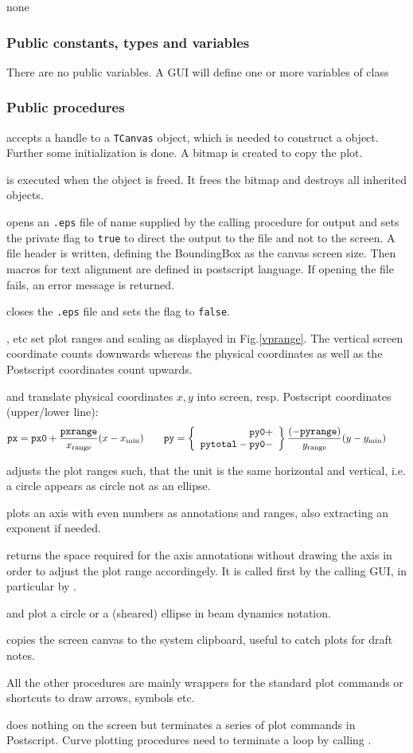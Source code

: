 \documentclass[12pt]{article}
\newcommand\code[1]{{\tt #1}}
\newcommand{\unico}[1]{{\color{burntorange}\code{#1}}}
\newcommand{\opaguif}[1]{\colorbox{violet!30}{{\color{black}\code{#1}}}}
\newcommand{\oguif}[1]{\hyperref[#1]{\opaguif{#1}}}
\newcommand{\uses}[1]{\flushleft {\bf Uses:} #1}
\newcommand{\pvar}[1]{\subsubsection*{Public constants, types and variables} #1}
\newcommand{\ppro}[1]{\subsubsection*{Public procedures} #1}
\begin{document}
\uses{none}

\pvar{
There are no public variables. A GUI will define one or more variables of class \unico{Vplot}
}

\ppro{
\unico{Create} accepts a handle to a \code{TCanvas} object, which is needed to construct a \unico{Vplot} object. Further some initialization is done. A bitmap is created to copy the plot.

\unico{Destroy} is executed when the \unico{Vplot} object is freed. It frees the bitmap and destroys all inherited objects. 

\unico{PS\_start} opens an \code{*.eps} file of name \unico{psfile} supplied by the calling procedure for output and sets the private flag \unico{PS} to \code{true} to direct the output to the file and not to the screen. A file header is written, defining the BoundingBox as the canvas screen size. Then macros for text alignment are defined in postscript language. If opening the file fails, an error message is returned.

\unico{PS\_stop} closes the \code{*.eps} file and sets the flag \unico{PS} to \code{false}.

\unico{SetRange*}, \unico{SetMargin*} etc set plot ranges and scaling as displayed in Fig.\ref{vprange}. The vertical screen coordinate counts downwards whereas the physical coordinates as well as the Postscript coordinates count upwards. 

\unico{getpx,getpy} and \unico{PS\_getpxr,PS\_getpyr} translate physical coordinates $x,y$ into screen, resp. Postscript coordinates (upper/lower line):
\[
{\tt px}={\tt px0}+\frac{\tt pxrange}{x_{\rm range}} (x-x_{\rm min}) \qquad
{\tt py}=\left\{ \begin{array}{r} {\tt py0} + \\ {\tt pytotal} - {\tt py0} -  \end{array} \right\} \frac{(-{\tt pyrange})}{y_{\rm range}} (y-y_{\rm min}) \qquad
\]

\unico{AdjustAspectRatio} adjusts the plot ranges such, that the unit is the same horizontal and vertical, i.e. a circle appears as circle not as an ellipse.

\unico{Axis} plots an axis with even numbers as annotations and ranges, also extracting an exponent if needed. 

\unico{GetAxisSpace} returns the space required for the axis annotations without drawing the axis in order to adjust the plot range accordingely. It is called first by the calling GUI, in particular by \oguif{comfigureframe}.

\unico{Circle} and \unico{Ellipse} plot a circle or a (sheared) ellipse in beam dynamics notation.

\unico{GrabImage} copies the screen canvas to the system clipboard, useful to catch plots for draft notes.

All the other procedures are mainly wrappers for the standard plot commands or shortcuts to draw arrows, symbols etc.

\unico{Stroke} does nothing on the screen but terminates a series of plot commands in Postscript. Curve plotting procedures need to terminate a \unico{LineTo...} loop by calling \unico{stroke}.
}
\end{document}

